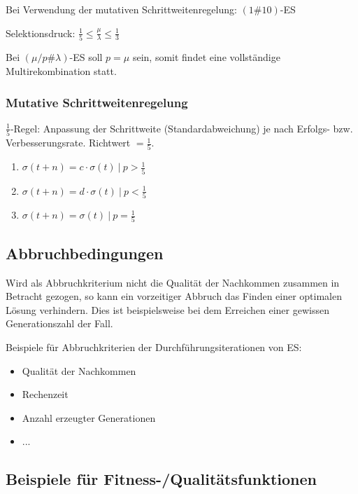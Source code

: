 Bei Verwendung der mutativen Schrittweitenregelung: $(1\#10)$-ES

Selektionsdruck: $\frac{1}{5} \le \frac{\mu}{\lambda} \le \frac{1}{3}$

Bei $(\mu / p \# \lambda)$-ES soll $p = \mu$ sein, somit findet eine vollständige Multirekombination statt.

\subsubsection{Mutative Schrittweitenregelung}

$\frac{1}{5}$-Regel: Anpassung der Schrittweite (Standardabweichung) je nach Erfolgs- bzw. Verbesserungsrate. Richtwert $= \frac{1}{5}$.

\begin{enumerate}
	\item $\sigma(t+n) = c \cdot \sigma(t)\ |\ p > \frac{1}{5}$
    \item $\sigma(t+n) = d \cdot \sigma(t)\ |\ p < \frac{1}{5}$
    \item $\sigma(t+n) = \sigma(t)\ |\ p = \frac{1}{5}$
\end{enumerate}

\subsection{Abbruchbedingungen}

Wird als Abbruchkriterium nicht die Qualität der Nachkommen zusammen in Betracht gezogen, so kann ein vorzeitiger Abbruch das Finden einer optimalen Lösung verhindern.
Dies ist beispielsweise bei dem Erreichen einer gewissen Generationszahl der Fall.

Beispiele für Abbruchkriterien der Durchführungsiterationen von ES:
\begin{itemize}
	\item Qualität der Nachkommen
	\item Rechenzeit
	\item Anzahl erzeugter Generationen
	\item ...
\end{itemize}

\subsection{Beispiele für Fitness-/Qualitätsfunktionen}




